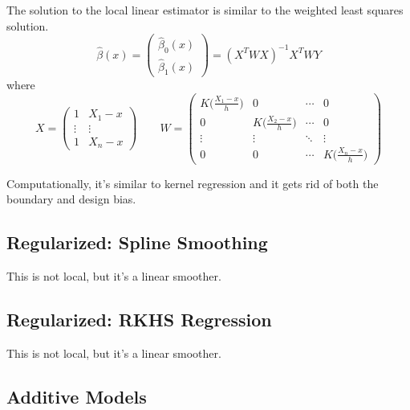 \documentclass{article}
\begin{document}
    \begin{theorem}
      The solution to the local linear estimator is similar to the weighted least squares solution. 
      \begin{equation}
        \hat{\beta}(x) = \begin{pmatrix} \hat{\beta}_0 (x) \\ \hat{\beta}_1 (x) \end{pmatrix} = (X^T W X)^{-1} X^T W Y
      \end{equation}
      where 
      \begin{equation}
        X = \begin{pmatrix} 1 & X_1 - x \\ \vdots & \vdots \\ 1 & X_n - x \end{pmatrix} \qquad W = \begin{pmatrix} K \bigg( \frac{X_1 - x}{h} \bigg) & 0 & \cdots & 0 \\ 0 & K \bigg( \frac{X_2 - x}{h} \bigg) & \cdots & 0 \\ \vdots & \vdots & \ddots & \vdots \\ 0 & 0 & \cdots & K \bigg( \frac{X_n - x}{h} \bigg) \end{pmatrix}
      \end{equation}
    \end{theorem}

    Computationally, it's similar to kernel regression and it gets rid of both the boundary and design bias. 

  \subsection{Regularized: Spline Smoothing}

    This is not local, but it's a linear smoother. 

  \subsection{Regularized: RKHS Regression}

    This is not local, but it's a linear smoother. 

  \subsection{Additive Models}
\end{document}
